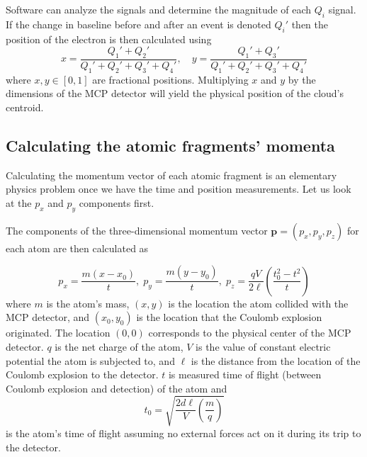 Software can analyze the signals and determine the magnitude of each $Q_i$ signal. If the change in baseline before and after an event is denoted $Q_i'$ then the position of the electron is then calculated using
\begin{equation}\label{eq:xy}
x = \frac{Q_1' + Q_2'}
         {Q_1' + Q_2' + Q_3' + Q_4'} ,\quad
y = \frac{Q_1' + Q_3'}
         {Q_1' + Q_2' + Q_3' + Q_4'}
\end{equation}
where $x,y \in [0,1]$ are fractional positions. Multiplying $x$ and $y$ by the dimensions of the MCP detector will yield the physical position of the cloud's centroid.

\subsection{Calculating the atomic fragments' momenta}
Calculating the momentum vector of each atomic fragment is an elementary physics problem once we have the time and position measurements. Let us look at the $p_x$ and $p_y$ components first.

The components of the three-dimensional momentum vector $\mathbf{p} = (p_x,p_y,p_z)$ for each atom are then calculated as

\begin{equation}\label{eq:CEImomenta}
p_x = \frac{m(x-x_0)}{t} ,\;
p_y = \frac{m(y-y_0)}{t} ,\;
p_z = \frac{qV}{2\ell} \left( \frac{t_0^2 - t^2}{t} \right)
\end{equation}
where $m$ is the atom's mass, $(x,y)$ is the location the atom collided with the MCP detector, and $(x_0,y_0)$ is the location that the Coulomb explosion originated. The location $(0,0)$ corresponds to the physical center of the MCP detector. $q$ is the net charge of the atom, $V$ is the value of constant electric potential the atom is subjected to, and $\ell$ is the distance from the location of the Coulomb explosion to the detector. $t$ is measured time of flight (between Coulomb explosion and detection) of the atom and 
\begin{equation}
t_0 = \sqrt{\frac{2d\ell}{V} \left( \frac{m}{q} \right)}
\end{equation}
is the atom's time of flight assuming no external forces act on it during its trip to the detector.

